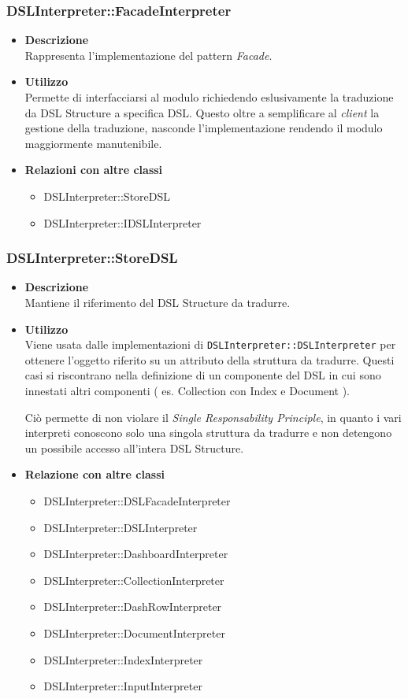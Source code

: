 \subsubsection{DSLInterpreter::FacadeInterpreter}
\begin{itemize}
\item \textbf{Descrizione} \hfill \\
  Rappresenta l'implementazione del pattern \textit{Facade}.
\item \textbf{Utilizzo} \hfill \\
  Permette di interfacciarsi al modulo richiedendo eslusivamente la traduzione da DSL Structure a specifica DSL. Questo oltre a semplificare al \textit{client} la gestione della traduzione, nasconde l'implementazione rendendo il modulo maggiormente manutenibile.
\item \textbf{Relazioni con altre classi} \hfill
  \begin{itemize}
  \item DSLInterpreter::StoreDSL
  \item DSLInterpreter::IDSLInterpreter
  \end{itemize}
\end{itemize}
\subsubsection{DSLInterpreter::StoreDSL}
\begin{itemize}
\item \textbf{Descrizione} \hfill \\
  Mantiene il riferimento del DSL Structure da tradurre.
\item \textbf{Utilizzo} \hfill \\
  Viene usata dalle implementazioni di \texttt{DSLInterpreter::DSLInterpreter} per ottenere l'oggetto riferito su un attributo della struttura da tradurre. Questi casi si riscontrano nella definizione di un componente del DSL in cui sono innestati altri componenti ( es. Collection con Index e Document ).

  Ciò permette di non violare il \textit{Single Responsability Principle}, in quanto i vari interpreti conoscono solo una singola struttura da tradurre e non detengono un possibile accesso all'intera DSL Structure.
\item \textbf{Relazione con altre classi} \hfill
  \begin{itemize}
  \item DSLInterpreter::DSLFacadeInterpreter
  \item DSLInterpreter::DSLInterpreter
  \item DSLInterpreter::DashboardInterpreter
  \item DSLInterpreter::CollectionInterpreter
  \item DSLInterpreter::DashRowInterpreter
  \item DSLInterpreter::DocumentInterpreter
  \item DSLInterpreter::IndexInterpreter
  \item DSLInterpreter::InputInterpreter
  \end{itemize}
\end{itemize}
